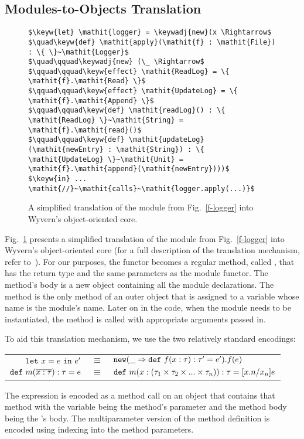 \subsection{Modules-to-Objects Translation}

\begin{figure}[htb]
\begin{lstlisting}[mathescape=true]
$\keyw{let} \mathit{logger} = \keywadj{new}(x \Rightarrow$
$\quad\keyw{def} \mathit{apply}(\mathit{f} : \mathit{File}) : \{ \}~\mathit{Logger}$
$\quad\qquad\keywadj{new} (\_ \Rightarrow$
$\qquad\qquad\keyw{effect} \mathit{ReadLog} = \{ \mathit{f}.\mathit{Read} \}$
$\qquad\qquad\keyw{effect} \mathit{UpdateLog} = \{ \mathit{f}.\mathit{Append} \}$
$\qquad\qquad\keyw{def} \mathit{readLog}() : \{ \mathit{ReadLog} \}~\mathit{String} = \mathit{f}.\mathit{read}()$
$\qquad\qquad\keyw{def} \mathit{updateLog}(\mathit{newEntry} : \mathit{String}) : \{ \mathit{UpdateLog} \}~\mathit{Unit} = \mathit{f}.\mathit{append}(\mathit{newEntry})))$
$\keyw{in} ... \mathit{//}~\mathit{calls}~\mathit{logger.apply(...)}$
\end{lstlisting}
\caption{A simplified translation of the  module from Fig.~\ref{f-logger} into Wyvern's object-oriented core.}
\label{f-module-translation}
\end{figure}

Fig.~\ref{f-module-translation} presents a simplified translation of the  module from Fig.~\ref{f-logger} into Wyvern's object-oriented core (for a full description of the translation mechanism, refer to~\cite{melicher17}). For our purposes, the functor becomes a regular method, called , that has the return type  and the same parameters as the module functor. The method's body is a new object containing all the module declarations. The  method is the only method of an outer object that is assigned to a variable whose name is the module's name. Later on in the code, when the  module needs to be instantiated, the  method is called with appropriate arguments passed in.

To aid this translation mechanism, we use the two relatively standard encodings:

\begin{minipage}{\linewidth}
{\small
\begin{tabular}{r@{\hskip 5pt}c@{\hskip 5pt}l}
  $\mathtt{let}~ x = e~\mathtt{in}~ e'$ & $\equiv$ & $\mathtt{new} (\_ \Rightarrow \mathtt{def}~ f(x : \tau) : \tau' = e').f(e)$\\%
  $\mathtt{def}~ m(\overline{x : \tau}) : \tau = e$ & $\equiv$ & $\mathtt{def}~ m(x : (\tau_1 \times \tau_2 \times ... \times \tau_n)) : \tau = [x.n/x_n]e$
\end{tabular}
}
\end{minipage}
The  expression is encoded as a method call on an object that contains that method with the  variable being the method's parameter and the method body being the 's body. The multiparameter version of the method definition is encoded using indexing into the method parameters.



